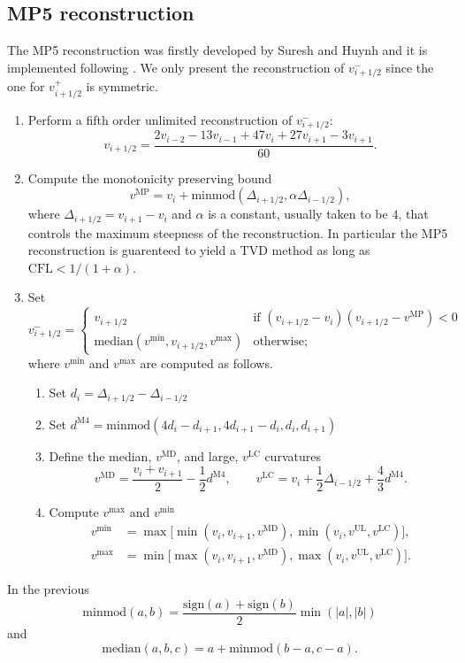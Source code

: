 \subsection{MP5 reconstruction}
The MP5 reconstruction was firstly developed by Suresh and Huynh
\cite{suresh} and it is implemented following \cite{mignone}. We only
present the reconstruction of $v_{i+1/2}^-$ since the one for
$v_{i+1/2}^+$ is symmetric.
\begin{enumerate}
  \item Perform a fifth order unlimited reconstruction of $v_{i+1/2}^-$:
  \[
    v_{i+1/2} = \frac{2 v_{i-2} - 13 v_{i-1} + 47 v_i + 27 v_{i+1} - 3
    v_{i+1}}{60}.
  \]
  \item Compute the monotonicity preserving bound
  \[
    v^{\mathrm{MP}} = v_i + \mathrm{minmod}(\Delta_{i+1/2},
    \alpha\Delta_{i-1/2}),
  \]
  where $\Delta_{i+1/2} = v_{i+1} - v_i$ and $\alpha$ is a constant,
  usually taken to be $4$, that controls the maximum steepness of the
  reconstruction. In particular the MP5 reconstruction is guarenteed to
  yield a TVD method as long as $\mathrm{CFL} < 1 / (1+\alpha)$.
  \item Set
  \[
    v_{i+1/2}^- =
    \begin{cases}
      v_{i+1/2} & \textrm{if } (v_{i+1/2}-v_i)(v_{i+1/2}-v^{\mathrm{MP}})
      < 0 \\
      \mathrm{median}(v^{\min}, v_{i+1/2}, v^{\max}) &
      \textrm{otherwise};
    \end{cases}
  \]
  where $v^{\min}$ and $v^{\max}$ are computed as follows.
  \begin{enumerate}
    \item Set $d_i = \Delta_{i+1/2} - \Delta_{i-1/2}$
    \item Set $d^{\mathrm{M4}} = \mathrm{minmod}(4 d_i - d_{i+1}, 4
    d_{i+1} - d_i, d_i, d_{i+1})$
    \item Define the median, $v^{\mathrm{MD}}$, and large,
    $v^{\mathrm{LC}}$ curvatures
    \[
      v^{\mathrm{MD}} = \frac{v_i+v_{i+1}}{2} - \frac{1}{2}
      d^{\mathrm{M4}}, \qquad
      v^{\mathrm{LC}} = v_i + \frac{1}{2} \Delta_{i-1/2} + \frac{4}{3}
      d^{\mathrm{M4}}.
    \]
    \item Compute $v^{\max}$ and $v^{\min}$
    \begin{align*}
      v^{\min} &= \max\big[\min(v_i, v_{i+1}, v^{\mathrm{MD}}),
        \min(v_i, v^{\mathrm{UL}}, v^{\mathrm{LC}})\big], \\
      v^{\max} &= \min\big[\max(v_i, v_{i+1}, v^{\mathrm{MD}}),
        \max(v_i, v^{\mathrm{UL}}, v^{\mathrm{LC}})\big].
    \end{align*}
  \end{enumerate}
\end{enumerate}
In the previous
\[
  \mathrm{minmod}(a,b) = \frac{\mathrm{sign}(a) + \mathrm{sign}(b)}{2}
  \min(|a|, |b|)
\]
and
\[
  \mathrm{median}(a,b,c) = a + \mathrm{minmod}(b-a, c-a).
\]

